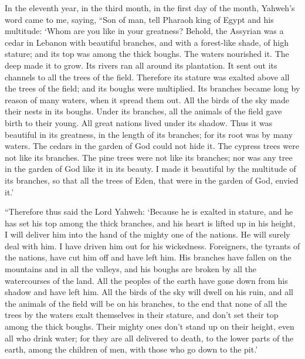  In the eleventh year, in the third month, in the first day
of the month, Yahweh's word came to me, saying,  ``Son of
man, tell Pharaoh king of Egypt and his multitude: `Whom are you like in
your greatness?  Behold, the Assyrian was a cedar in Lebanon
with beautiful branches, and with a forest-like shade, of high stature;
and its top was among the thick boughs.  The waters
nourished it. The deep made it to grow. Its rivers ran all around its
plantation. It sent out its channels to all the trees of the field.
 Therefore its stature was exalted above all the trees of
the field; and its boughs were multiplied. Its branches became long by
reason of many waters, when it spread them out.  All the
birds of the sky made their nests in its boughs. Under its branches, all
the animals of the field gave birth to their young. All great nations
lived under its shadow.  Thus it was beautiful in its
greatness, in the length of its branches; for its root was by many
waters.  The cedars in the garden of God could not hide it.
The cypress trees were not like its branches. The pine trees were not
like its branches; nor was any tree in the garden of God like it in its
beauty.  I made it beautiful by the multitude of its
branches, so that all the trees of Eden, that were in the garden of God,
envied it.'

 ``Therefore thus said the Lord Yahweh: `Because he is
exalted in stature, and he has set his top among the thick branches, and
his heart is lifted up in his height,  I will deliver him
into the hand of the mighty one of the nations. He will surely deal with
him. I have driven him out for his wickedness.  Foreigners,
the tyrants of the nations, have cut him off and have left him. His
branches have fallen on the mountains and in all the valleys, and his
boughs are broken by all the watercourses of the land. All the peoples
of the earth have gone down from his shadow and have left him.
 All the birds of the sky will dwell on his ruin, and all
the animals of the field will be on his branches,  to the
end that none of all the trees by the waters exalt themselves in their
stature, and don't set their top among the thick boughs. Their mighty
ones don't stand up on their height, even all who drink water; for they
are all delivered to death, to the lower parts of the earth, among the
children of men, with those who go down to the pit.'

